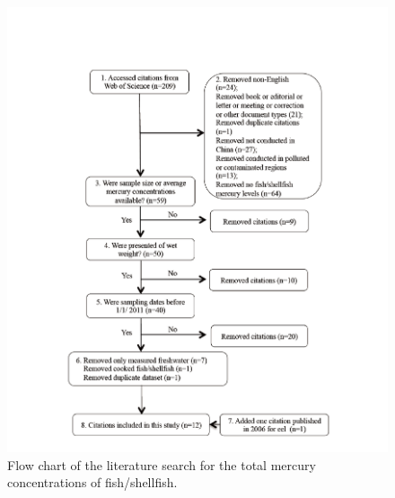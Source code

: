 \begin{figure}
  \centering
    \label{fig:Fig22}
  \includegraphics[scale=1]{Figures/Fig22.pdf}
  \caption[Flow chart of the literature search for the total mercury concentrations of
fish/shellfish]{Flow chart of the literature search for the total mercury concentrations of
fish/shellfish.}
\end{figure}

